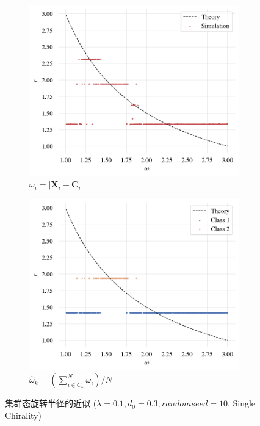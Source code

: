 \documentclass{article}
\begin{document}
\begin{figure}[H]
	\centering
	\begin{subfigure}[b]{0.49\textwidth}
		\includegraphics[width=\textwidth]{./figs/SwarmStateRadius.png}
		\vspace{-1cm}
		\caption{$\omega_i = \left| \mathbf{X}_i - \mathbf{C}_i\right|$}
	\end{subfigure}
	\begin{subfigure}[b]{0.49\textwidth}
		\includegraphics[width=\textwidth]{./figs/classMeanOmegaRadius.png}
		\vspace{-1cm}
		\caption{$\hat{\omega}_k = (\sum\nolimits_{i \in C_k}^N{\omega _i}) / N$}
	\end{subfigure}
	\vspace{-0.5cm}
	\caption{集群态旋转半径的近似 ($\lambda=0.1, d_0=0.3, random seed=10$, Single Chirality)}
	\label{fig:fig21.4}
\end{figure}
\end{document}
